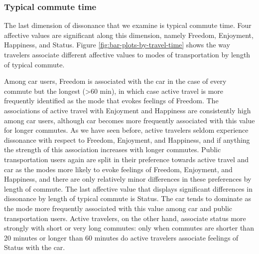 \documentclass[]{elsarticle} %
\begin{document}
\hypertarget{typical-commute-time-1}{%
\subsubsection{Typical commute time}\label{typical-commute-time-1}}

The last dimension of dissonance that we examine is typical commute
time. Four affective values are significant along this dimension, namely
Freedom, Enjoyment, Happiness, and Status. Figure
\ref{fig:bar-plots-by-travel-time} shows the way travelers associate
different affective values to modes of transportation by length of
typical commute.

Among car users, Freedom is associated with the car in the case of every
commute but the longest (\textgreater60 min), in which case active
travel is more frequently identified as the mode that evokes feelings of
Freedom. The associations of active travel with Enjoyment and Happiness
are consistently high among car users, although car becomes more
frequently associated with this value for longer commutes. As we have
seen before, active travelers seldom experience dissonance with respect
to Freedom, Enjoyment, and Happiness, and if anything the strength of
this association increases with longer commutes. Public transportation
users again are split in their preference towards active travel and car
as the modes more likely to evoke feelings of Freedom, Enjoyment, and
Happiness, and there are only relatively minor differences in these
preferences by length of commute. The last affective value that displays
significant differences in dissonance by length of typical commute is
Status. The car tends to dominate as the mode more frequently associated
with this value among car and public transportation users. Active
travelers, on the other hand, associate status more strongly with short
or very long commutes: only when commutes are shorter than 20 minutes or
longer than 60 minutes do active travelers associate feelings of Status
with the car.
\end{document}
